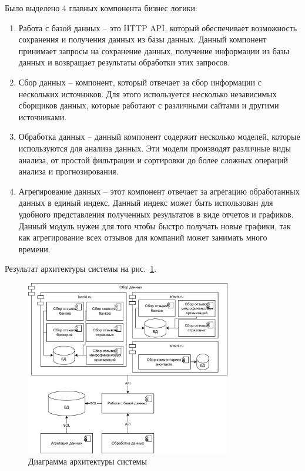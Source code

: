 \documentclass[PI, VKR]{HSEUniversity}
\begin{document}
Было выделено 4 главных компонента бизнес логики:
\begin{enumerate}
\item Работа с базой данных -- это HTTP API, который обеспечивает возможность сохранения и получения данных из базы данных. Данный компонент принимает запросы на сохранение данных, получение информации из базы данных и возвращает результаты обработки этих запросов.
\item Сбор данных -- компонент, который отвечает за сбор информации с нескольких источников. Для этого используется несколько независимых сборщиков данных, которые работают с различными сайтами и другими источниками.
\item Обработка данных -- данный компонент содержит несколько моделей, которые используются для анализа данных. Эти модели производят различные виды анализа, от простой фильтрации и сортировки до более сложных операций анализа и прогнозирования.
\item Агрегирование данных -- этот компонент отвечает за агрегацию обработанных данных в единый индекс. Данный индекс может быть использован для удобного представления полученных результатов в виде отчетов и графиков. Данный модуль нужен для того чтобы быстро получать новые графики, так как агрегирование всех отзывов для компаний может занимать много времени.
\end{enumerate}

Результат архитектуры системы на рис.~\ref{fig:architecture}.

\begin{figure}[h!]
\centering
\includegraphics[width=0.8\textwidth]{img/architecture.png}
\caption{\label{fig:architecture}Диаграмма архитектуры системы}
\end{figure}
\end{document}
